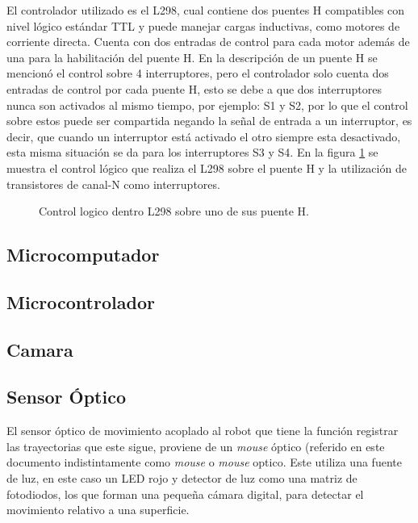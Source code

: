 \documentclass{iccmemoria}
\begin{document}
El controlador utilizado es el L298, cual contiene dos puentes H compatibles con nivel lógico estándar TTL y puede manejar cargas inductivas, como motores de corriente directa. Cuenta con dos entradas de control para cada motor además de una para la habilitación del puente H. En la descripción de un puente H se mencionó el control sobre 4 interruptores, pero el controlador solo cuenta dos entradas de control por cada puente H, esto se debe a que dos interruptores nunca son activados al mismo tiempo, por ejemplo: S1 y S2, por lo que el control sobre estos puede ser compartida negando la señal de entrada a un interruptor, es decir, que cuando un interruptor está activado el otro siempre esta desactivado, esta misma situación se da para los interruptores S3 y S4. En la figura \ref{fig:H bridge circuit} se muestra el control lógico que realiza el L298 sobre el puente H y la utilización de transistores de canal-N  como interruptores.\\

\begin{figure}[H]
  \centering
  
  \caption{Control logico dentro L298 sobre uno de sus puente H.}
  \label{fig:H bridge circuit}
\end{figure}

\subsection{Microcomputador}

\subsection{Microcontrolador}

\subsection{Camara}

\subsection{Sensor Óptico}

El sensor óptico de movimiento acoplado al robot que tiene la función registrar las trayectorias que este sigue, proviene de un \emph{mouse} óptico (referido en este documento indistintamente como \emph{mouse} o \emph{mouse} optico. Este utiliza una fuente de luz, en este caso un LED rojo y detector de luz como una matriz de fotodiodos, los que forman una pequeña cámara digital, para detectar el movimiento relativo a una superficie.\\
\end{document}
